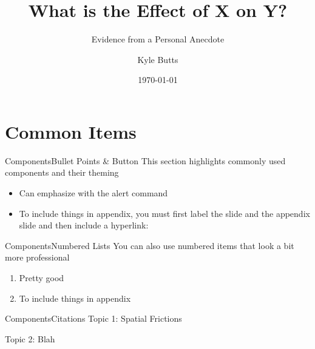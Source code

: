 \documentclass[aspectratio=43]{beamer}
\title{What is the Effect of X on Y?}
\subtitle{Evidence from a Personal Anecdote}
\date{\today}
\author{Kyle Butts}
\begin{document}
\begin{frame}
\maketitle

\end{frame}

\section{Common Items}

\begin{frame}{Components}{Bullet Points \& Button}\label{main1}
    This section highlights commonly used components and their theming

    \begin{itemize}
        \item Can emphasize with \alert{the alert command}
        
        \item To include things in appendix, you must first label the slide and the appendix slide and then include a hyperlink:
        
        \vspace{5mm}
        \hyperlink{appendix1}{}
    \end{itemize}
\end{frame}

\begin{frame}{Components}{Numbered Lists}
    You can also use numbered items that look a bit more professional

    \begin{enumerate}
        \item Pretty good
        
        \item To include things in appendix
    \end{enumerate}
\end{frame}

\begin{frame}{Components}{Citations}
    Topic 1: Spatial Frictions
    \begin{citecolor}
    \end{citecolor}

    \vspace{5mm}
    Topic 2: Blah 
    \begin{citecolor}
    \end{citecolor}
\end{frame}
\end{document}
